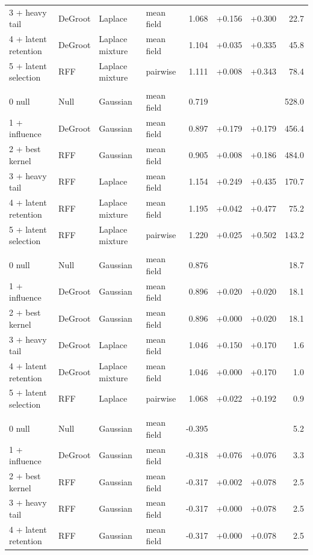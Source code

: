 \begin{longtable}{llllrrrr}
3 + heavy tail & DeGroot & Laplace & mean field & 1.068 & +0.156 & +0.300 & 22.7 \\
4 + latent retention & DeGroot & Laplace mixture & mean field & 1.104 & +0.035 & +0.335 & 45.8 \\
5 + latent selection & RFF & Laplace mixture & pairwise & 1.111 & +0.008 & +0.343 & 78.4 \\
\midrule
\multicolumn{8}{l}{\vkg{}} \\
0 null & Null & Gaussian & mean field & 0.719 &  &  & 528.0 \\
1 + influence & DeGroot & Gaussian & mean field & 0.897 & +0.179 & +0.179 & 456.4 \\
2 + best kernel & RFF & Gaussian & mean field & 0.905 & +0.008 & +0.186 & 484.0 \\
3 + heavy tail & RFF & Laplace & mean field & 1.154 & +0.249 & +0.435 & 170.7 \\
4 + latent retention & RFF & Laplace mixture & mean field & 1.195 & +0.042 & +0.477 & 75.2 \\
5 + latent selection & RFF & Laplace mixture & pairwise & 1.220 & +0.025 & +0.502 & 143.2 \\
\midrule
\multicolumn{8}{l}{\senate{}} \\
0 null & Null & Gaussian & mean field & 0.876 &  &  & 18.7 \\
1 + influence & DeGroot & Gaussian & mean field & 0.896 & +0.020 & +0.020 & 18.1 \\
2 + best kernel & DeGroot & Gaussian & mean field & 0.896 & +0.000 & +0.020 & 18.1 \\
3 + heavy tail & DeGroot & Laplace & mean field & 1.046 & +0.150 & +0.170 & 1.6 \\
4 + latent retention & DeGroot & Laplace mixture & mean field & 1.046 & +0.000 & +0.170 & 1.0 \\
5 + latent selection & RFF & Laplace & pairwise & 1.068 & +0.022 & +0.192 & 0.9 \\
\midrule
\multicolumn{8}{l}{\spinos{}} \\
0 null & Null & Gaussian & mean field & -0.395 &  &  & 5.2 \\
1 + influence & DeGroot & Gaussian & mean field & -0.318 & +0.076 & +0.076 & 3.3 \\
2 + best kernel & RFF & Gaussian & mean field & -0.317 & +0.002 & +0.078 & 2.5 \\
3 + heavy tail & RFF & Gaussian & mean field & -0.317 & +0.000 & +0.078 & 2.5 \\
4 + latent retention & RFF & Gaussian & mean field & -0.317 & +0.000 & +0.078 & 2.5 \\

\end{longtable}
